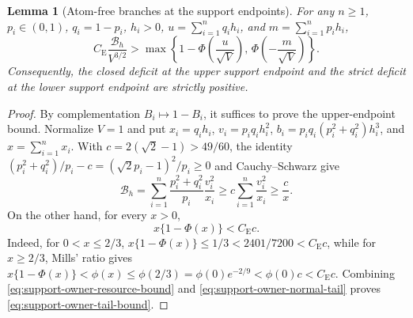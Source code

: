 \documentclass[11pt]{article}
\numberwithin{equation}{section}
\newtheorem{lemma}[theorem]{Lemma}
\theoremstyle{definition}
\theoremstyle{remark}
\newcommand{\be}{C_{\mathrm E}}
\newcommand{\ph}{\phi}
\begin{document}
\begin{samepage}
\begin{lemma}[Atom-free branches at the support endpoints]
\label{lem:support-owners-without-atom-term}
For any $n\geq1$, $p_i\in(0,1)$, $q_i=1-p_i$, $h_i>0$, $u=\sum_{i=1}^nq_ih_i$,
and $m=\sum_{i=1}^np_ih_i$,
\begin{equation}
 \be\frac{\mathcal B_h}{V^{3/2}}
 >\max\left\{
  1-\Phi\!\left(\frac{u}{\sqrt V}\right),\,
  \Phi\!\left(-\frac{m}{\sqrt V}\right)
 \right\}.
\label{eq:support-owner-tail-bound}
\end{equation}
Consequently, the closed deficit at the upper support endpoint and the strict
deficit at the lower support endpoint are strictly positive.
\end{lemma}
\end{samepage}

\begin{proof}
By complementation $B_i\mapsto1-B_i$, it suffices to prove the upper-endpoint
bound. Normalize $V=1$ and put $x_i=q_ih_i$, $v_i=p_iq_ih_i^2$,
$b_i=p_iq_i(p_i^2+q_i^2)h_i^3$, and $x=\sum_{i=1}^nx_i$. With
$c=2(\sqrt2-1)>49/60$, the identity $(p_i^2+q_i^2)/p_i-c=(\sqrt2p_i-1)^2/p_i\ge0$
and Cauchy--Schwarz give
\begin{equation}
 \mathcal B_h=\sum_{i=1}^n\frac{p_i^2+q_i^2}{p_i}\frac{v_i^2}{x_i}
 \geq c\sum_{i=1}^n\frac{v_i^2}{x_i}
 \geq\frac{c}{x}.
\label{eq:support-owner-resource-bound}
\end{equation}
On the other hand, for every $x>0$,
\begin{equation}
 x\{1-\Phi(x)\}<\be c.
\label{eq:support-owner-normal-tail}
\end{equation}
Indeed, for $0<x\le2/3$, $x\{1-\Phi(x)\}\le1/3<2401/7200<\be c$, while for
$x\ge2/3$, Mills' ratio gives $x\{1-\Phi(x)\}<\ph(x)\le\ph(2/3)=\ph(0)e^{-2/9}<\ph(0)c<\be c$.
Combining \eqref{eq:support-owner-resource-bound} and
\eqref{eq:support-owner-normal-tail} proves \eqref{eq:support-owner-tail-bound}.
\end{proof}
\end{document}
